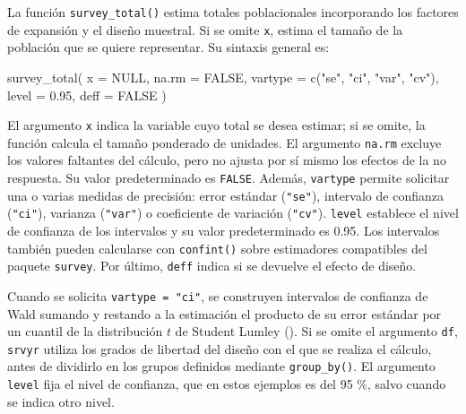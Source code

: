 \documentclass[
  spanish,
  11pt,
  letterpaper,
  oneside,
  open=any]{scrbook}
\newenvironment{Shaded}{\begin{snugshade}}{\end{snugshade}}
\newcommand{\AttributeTok}[1]{\textcolor[rgb]{0.40,0.45,0.13}{#1}}
\newcommand{\ConstantTok}[1]{\textcolor[rgb]{0.56,0.35,0.01}{#1}}
\newcommand{\FloatTok}[1]{\textcolor[rgb]{0.68,0.00,0.00}{#1}}
\newcommand{\FunctionTok}[1]{\textcolor[rgb]{0.28,0.35,0.67}{#1}}
\newcommand{\NormalTok}[1]{\textcolor[rgb]{0.00,0.23,0.31}{#1}}
\newcommand{\StringTok}[1]{\textcolor[rgb]{0.13,0.47,0.30}{#1}}
\begin{document}
La función \texttt{survey\_total()} estima totales poblacionales
incorporando los factores de expansión y el diseño muestral. Si se omite
\texttt{x}, estima el tamaño de la población que se quiere representar.
Su sintaxis general es:

\begin{Shaded}
\begin{Highlighting}[]
\FunctionTok{survey\_total}\NormalTok{(}
  \AttributeTok{x =} \ConstantTok{NULL}\NormalTok{,}
  \AttributeTok{na.rm =} \ConstantTok{FALSE}\NormalTok{,}
  \AttributeTok{vartype =} \FunctionTok{c}\NormalTok{(}\StringTok{"se"}\NormalTok{, }\StringTok{"ci"}\NormalTok{, }\StringTok{"var"}\NormalTok{, }\StringTok{"cv"}\NormalTok{),}
  \AttributeTok{level =} \FloatTok{0.95}\NormalTok{,}
  \AttributeTok{deff =} \ConstantTok{FALSE}
\NormalTok{)}
\end{Highlighting}
\end{Shaded}

El argumento \texttt{x} indica la variable cuyo total se desea estimar;
si se omite, la función calcula el tamaño ponderado de unidades. El
argumento \texttt{na.rm} excluye los valores faltantes del cálculo, pero
no ajusta por sí mismo los efectos de la no respuesta. Su valor
predeterminado es \texttt{FALSE}. Además, \texttt{vartype} permite
solicitar una o varias medidas de precisión: error estándar
(\texttt{"se"}), intervalo de confianza (\texttt{"ci"}), varianza
(\texttt{"var"}) o coeficiente de variación (\texttt{"cv"}).
\texttt{level} establece el nivel de confianza de los intervalos y su
valor predeterminado es 0.95. Los intervalos también pueden calcularse
con \texttt{confint()} sobre estimadores compatibles del paquete
\texttt{survey}. Por último, \texttt{deff} indica si se devuelve el
efecto de diseño.

Cuando se solicita \texttt{vartype\ =\ "ci"}, se construyen intervalos
de confianza de Wald sumando y restando a la estimación el producto de
su error estándar por un cuantil de la distribución \(t\) de Student
Lumley (). Si se omite el argumento
\texttt{df}, \texttt{srvyr} utiliza los grados de libertad del diseño
con el que se realiza el cálculo, antes de dividirlo en los grupos
definidos mediante \texttt{group\_by()}. El argumento \texttt{level}
fija el nivel de confianza, que en estos ejemplos es del 95 \%, salvo
cuando se indica otro nivel.
\end{document}
